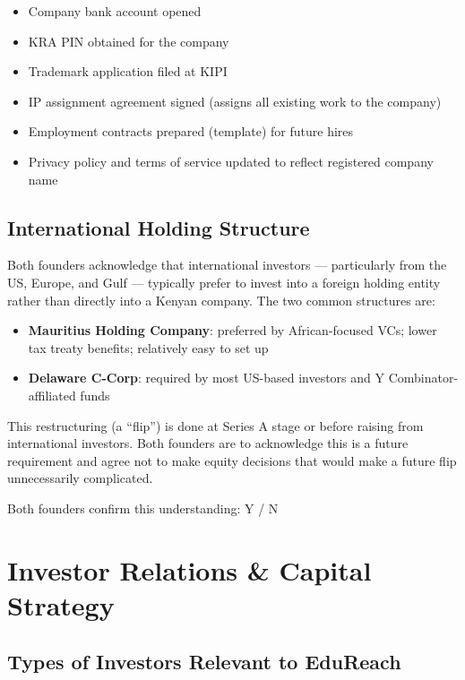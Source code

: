 \documentclass[12pt,a4paper]{article}
\newcommand{\cb}{$\square$\;}                   %
\begin{document}
\begin{itemize}[label=\cb]
  \item Company bank account opened
  \item KRA PIN obtained for the company
  \item Trademark application filed at KIPI
  \item IP assignment agreement signed (assigns all existing work to the company)
  \item Employment contracts prepared (template) for future hires
  \item Privacy policy and terms of service updated to reflect registered company name
\end{itemize}

\subsection{International Holding Structure}

Both founders acknowledge that international investors --- particularly from the US, Europe, and Gulf --- typically prefer to invest into a foreign holding entity rather than directly into a Kenyan company. The two common structures are:

\begin{itemize}
  \item \textbf{Mauritius Holding Company}: preferred by African-focused VCs; lower tax treaty benefits; relatively easy to set up
  \item \textbf{Delaware C-Corp}: required by most US-based investors and Y Combinator-affiliated funds
\end{itemize}

This restructuring (a ``flip'') is done at Series A stage or before raising from international investors. Both founders are to acknowledge this is a future requirement and agree not to make equity decisions that would make a future flip unnecessarily complicated.

Both founders confirm this understanding: \quad Y \;/\; N

\section{Investor Relations \& Capital Strategy}

\subsection{Types of Investors Relevant to EduReach}
\end{document}
